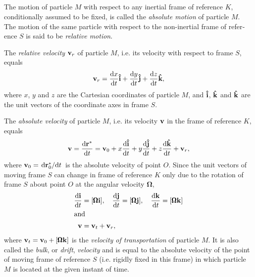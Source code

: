 \subsection{}\label{7.1.2} The motion of particle $M$ with respect to any inertial frame of reference $K$, conditionally assumed to be fixed, is called the \emph{absolute motion} of particle $M$. The motion of the same particle with respect to the non-inertial frame of refer­ence $S$ is said to be \emph{relative motion}.

The \emph{relative velocity} $\vb{v}_{r}$ of particle $M$, i.e. its velocity with respect to frame $S$, equals
\begin{equation*}%
\vb{v}_{r} = \dv{x}{t} \vu{i} +\dv{y}{t} \vu{j} + \dv{z}{t} \vu{k}, 
\end{equation*}
where $x$, $y$ and $z$ are the Cartesian coordinates of particle $M$, and $\vu{i}$, $\vu{k}$ and $\vu{k}$ are the unit vectors of the coordinate axes in frame $S$.

The \emph{absolute velocity} of particle $M$, i.e. its velocity $\vb{v}$ in the frame of reference $K$, equals
\begin{equation*}%
\vb{v} = \dv{\vb{r}^{*}}{t}= \vb{v}_{0} + x\dv{\vu{i}}{t}  + y\dv{\vu{j}}{t}  + z \dv{ \vu{k}}{t} + \vb{v}_{r},
\end{equation*}
where $\vb{v}_{0}= \dv*{\vb{r}^{*}_{0}}{t}$ is the absolute velocity of point $O$. Since the unit vectors of moving frame $S$ can change in frame of reference $K$ only due to the rotation of frame $S$ about point $O$ at the angular velocity $\pmb{\Omega}$,
\begin{align*}%
\dv{\vb{i}}{t} & = \qty[\pmb{\Omega} \vb{i}], \quad \dv{\vb{j}}{t} = \qty[\pmb{\Omega} \vb{j}], \quad \dv{\vb{k}}{t} = \qty[\pmb{\Omega} \vb{k}] \\
\intertext{and}
\vb{v} & =  \vb{v}_{t} + \vb{v}_{r},
\end{align*}
where $\vb{v}_{t} = \vb{v}_{0}+ \qty[\pmb{\Omega} \vb{k}]$ is the \emph{velocity of transportation} of par­ticle $M$. It is also called the \emph{bulk}, or \emph{drift}, \emph{velocity} and is equal to the absolute velocity of the point of moving frame of ref­erence $S$ (i.e. rigidly fixed in this frame) in which particle $M$ is located at the given instant of time.

